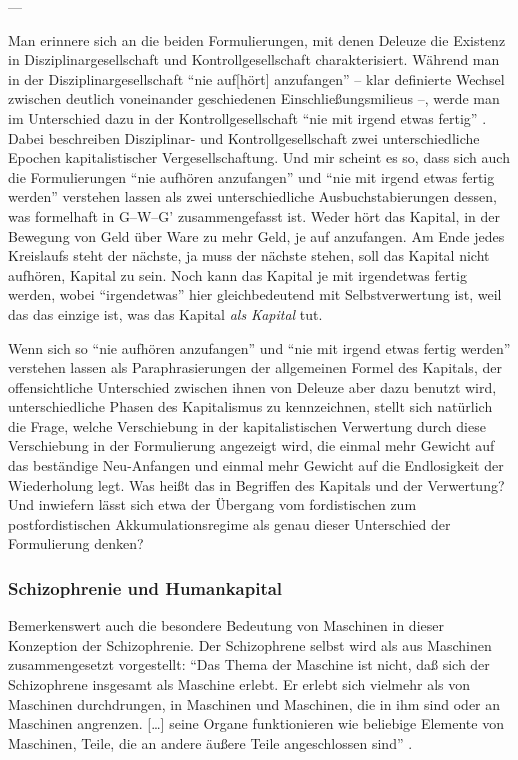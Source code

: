 \documentclass[12pt,
               DIV13,
               paper=a4,
               twoside=false,
               onehalfspacing,
               bibliography=totoc,
               toc=graduated,
               draft,
               ]{scrartcl}
\newcommand{\lips}{\dots\unkern}
\newcommand{\pc}[2]{\parencite[#1]{#2}}
\newcommand{\worries}[1]{\ifdraft{\textcolor{blue}{\texttt{(#1)}}}{}}
\newcommand{\gwg}{G--W--G'\xspace}
\begin{document}
---

\worries{???}

Man erinnere sich an die beiden Formulierungen, mit denen Deleuze die
Existenz in Disziplinargesellschaft und Kontrollgesellschaft
charakterisiert. Während man in der Disziplinargesellschaft "`nie
auf[hört] anzufangen"' \pc{257}{ps} -- klar definierte Wechsel
zwischen deutlich voneinander geschiedenen Einschließungsmilieus --,
werde man im Unterschied dazu in der Kontrollgesellschaft "`nie mit
irgend etwas fertig"' \pc{257}{ps}. Dabei beschreiben Disziplinar- und
Kontrollgesellschaft zwei unterschiedliche Epochen kapitalistischer
Vergesellschaftung. Und mir scheint es so, dass sich auch die
Formulierungen "`nie aufhören anzufangen"' und "`nie mit irgend etwas
fertig werden"' verstehen lassen als zwei unterschiedliche
Ausbuchstabierungen dessen, was formelhaft in \gwg zusammengefasst
ist. Weder hört das Kapital, in der Bewegung von Geld über Ware zu
mehr Geld, je auf anzufangen. Am Ende jedes Kreislaufs steht der
nächste, ja muss der nächste stehen, soll das Kapital nicht aufhören,
Kapital zu sein. Noch kann das Kapital je mit irgendetwas fertig
werden, wobei "`irgendetwas"' hier gleichbedeutend mit
Selbstverwertung ist, weil das das einzige ist, was das Kapital
\emph{als Kapital} tut.

Wenn sich so "`nie aufhören anzufangen"' und "`nie mit irgend etwas
fertig werden"' verstehen lassen als Paraphrasierungen der allgemeinen
Formel des Kapitals, der offensichtliche Unterschied zwischen ihnen
von Deleuze aber dazu benutzt wird, unterschiedliche Phasen des
Kapitalismus zu kennzeichnen, stellt sich natürlich die Frage, welche
Verschiebung in der kapitalistischen Verwertung durch diese
Verschiebung in der Formulierung angezeigt wird, die einmal mehr
Gewicht auf das beständige Neu-Anfangen und einmal mehr Gewicht auf
die Endlosigkeit der Wiederholung legt. Was heißt das in Begriffen des
Kapitals und der Verwertung? Und inwiefern lässt sich etwa der
Übergang vom fordistischen zum postfordistischen Akkumulationsregime
als genau dieser Unterschied der Formulierung denken?

\subsubsection{Schizophrenie und Humankapital}

Bemerkenswert auch die besondere Bedeutung von Maschinen in dieser
Konzeption der Schizophrenie. Der Schizophrene selbst wird als aus
Maschinen zusammengesetzt vorgestellt: "`Das Thema der Maschine ist
nicht, daß sich der Schizophrene insgesamt als Maschine erlebt. Er
erlebt sich vielmehr als von Maschinen durchdrungen, in Maschinen und
Maschinen, die in ihm sind oder an Maschinen angrenzen. [\lips] seine
Organe funktionieren wie beliebige Elemente von Maschinen, Teile, die
an andere äußere Teile angeschlossen sind"' \pc{18}{schizg}.
\end{document}
